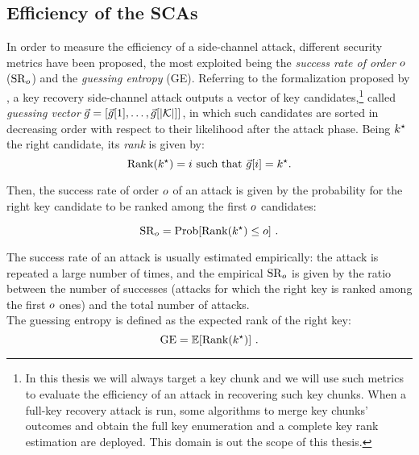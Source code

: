 \subsection{Efficiency of the SCAs}\label{sec:metrics}
In order to measure the efficiency of a side-channel attack, different security metrics have been proposed, the most exploited being the \emph{success rate of order} $o$ ($\mathrm{SR}_o$) and the \emph{guessing entropy} (GE). Referring to the formalization proposed by \cite{unifiedFramework}, a key recovery side-channel attack outputs a vector of key candidates,\footnote{In this thesis we will always target a key chunk and we will use such metrics to evaluate the efficiency of an attack in recovering such key chunks. When a full-key recovery attack is run, some algorithms to merge key chunks' outcomes and obtain the full key enumeration and a complete key rank estimation are deployed. This domain is out the scope of this thesis.} called {\em guessing vector} $\vec{g} = \left[\vec{g}[1], \dots, \vec{g}[{\lvert \mathcal{K} \rvert}]\right]$, in which such candidates are sorted in decreasing order with respect to their likelihood after the attack phase. Being $k^\star$ the right candidate, its \emph{rank} is given by:
\begin{equation}
\mathrm{Rank}(k^\star) = i \mbox{ such that } \vec{g}[i] = k^\star \mbox{.}
\end{equation}

Then, the success rate of order $o$ of an attack is given by the probability for the right key candidate to be ranked among the first $o$ candidates: 

\begin{equation}
\mathrm{SR}_o = \mathrm{Prob}[\mathrm{Rank}(k^\star)\leq o] \mbox{ .}
\end{equation}

The success rate of an attack is usually estimated empirically: the attack is repeated a large number of times, and the empirical $\mathrm{SR}_o$ is given by the ratio between the number of successes (attacks for which the right key is ranked among the first $o$ ones) and the total number of attacks. \\

The guessing entropy \cite{massey1994guessing} is defined as the expected rank of the right key: 
\begin{equation}
\mathrm{GE} = \mathbb{E}[\mathrm{Rank}(k^\star)]\mbox{ .}
\end{equation}

